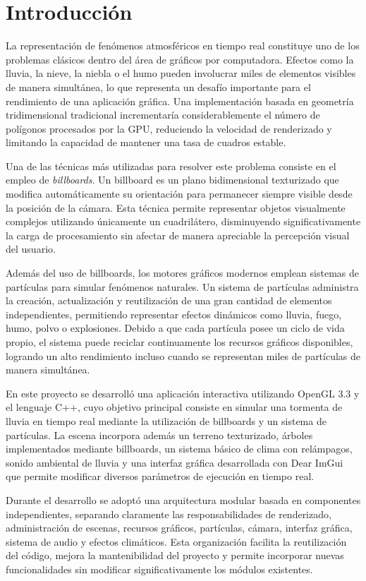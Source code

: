 \chapter{Introducción}

La representación de fenómenos atmosféricos en tiempo real constituye uno de los problemas clásicos dentro del área de gráficos por computadora. Efectos como la lluvia, la nieve, la niebla o el humo pueden involucrar miles de elementos visibles de manera simultánea, lo que representa un desafío importante para el rendimiento de una aplicación gráfica. Una implementación basada en geometría tridimensional tradicional incrementaría considerablemente el número de polígonos procesados por la GPU, reduciendo la velocidad de renderizado y limitando la capacidad de mantener una tasa de cuadros estable.

Una de las técnicas más utilizadas para resolver este problema consiste en el empleo de \textit{billboards}. Un billboard es un plano bidimensional texturizado que modifica automáticamente su orientación para permanecer siempre visible desde la posición de la cámara. Esta técnica permite representar objetos visualmente complejos utilizando únicamente un cuadrilátero, disminuyendo significativamente la carga de procesamiento sin afectar de manera apreciable la percepción visual del usuario.

Además del uso de billboards, los motores gráficos modernos emplean sistemas de partículas para simular fenómenos naturales. Un sistema de partículas administra la creación, actualización y reutilización de una gran cantidad de elementos independientes, permitiendo representar efectos dinámicos como lluvia, fuego, humo, polvo o explosiones. Debido a que cada partícula posee un ciclo de vida propio, el sistema puede reciclar continuamente los recursos gráficos disponibles, logrando un alto rendimiento incluso cuando se representan miles de partículas de manera simultánea.

En este proyecto se desarrolló una aplicación interactiva utilizando OpenGL 3.3 y el lenguaje C++, cuyo objetivo principal consiste en simular una tormenta de lluvia en tiempo real mediante la utilización de billboards y un sistema de partículas. La escena incorpora además un terreno texturizado, árboles implementados mediante billboards, un sistema básico de clima con relámpagos, sonido ambiental de lluvia y una interfaz gráfica desarrollada con Dear ImGui que permite modificar diversos parámetros de ejecución en tiempo real.

Durante el desarrollo se adoptó una arquitectura modular basada en componentes independientes, separando claramente las responsabilidades de renderizado, administración de escenas, recursos gráficos, partículas, cámara, interfaz gráfica, sistema de audio y efectos climáticos. Esta organización facilita la reutilización del código, mejora la mantenibilidad del proyecto y permite incorporar nuevas funcionalidades sin modificar significativamente los módulos existentes.

